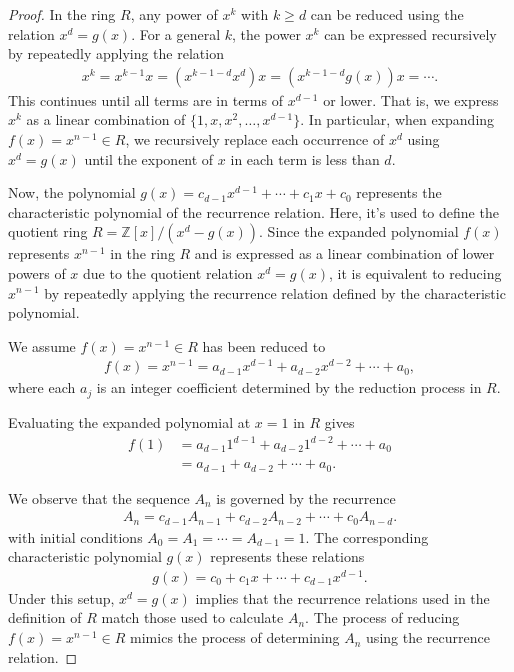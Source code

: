 \documentclass[12pt]{article}
\theoremstyle{plain}
\theoremstyle{definition}
\begin{document}
\begin{proof}
In the ring $R$, any power of $x^k$ with $k \geq d$ can be reduced using the relation $x^d = g(x)$. For a general $k$, the power $x^k$ can be expressed recursively by repeatedly applying the relation
\begin{align*}
x^k = x^{k-1} x = (x^{k-1-d} x^d) x = (x^{k-1-d} g(x)) x = \cdots .
\end{align*}
This continues until all terms are in terms of $x^{d-1}$ or lower. That is, we express $x^k$ as a linear combination of $\{1, x, x^2, \ldots, x^{d-1}\}$. In particular, when expanding $f(x) = x^{n-1} \in R$, we recursively replace each occurrence of $x^d$ using $x^d = g(x)$ until the exponent of $x$ in each term is less than $d$.

Now, the polynomial $g(x) = c_{d-1} x^{d-1} + \cdots + c_1 x + c_0$ represents the characteristic polynomial of the recurrence relation. Here, it's used to define the quotient ring $R = \mathbb{Z}[x]/(x^d - g(x))$. Since the expanded polynomial $f(x)$ represents $x^{n-1}$ in the ring $R$ and is expressed as a linear combination of lower powers of $x$ due to the quotient relation $x^d = g(x)$, it is equivalent to reducing $x^{n-1}$ by repeatedly applying the recurrence relation defined by the characteristic polynomial.

We assume $f(x) = x^{n-1} \in R$ has been reduced to
\begin{align*}
f(x) = x^{n-1} = a_{d-1} x^{d-1} + a_{d-2} x^{d-2} + \cdots + a_0 ,
\end{align*}
where each $a_j$ is an integer coefficient determined by the reduction process in $R$.

Evaluating the expanded polynomial at $x=1$ in $R$ gives
\begin{align*}
f(1) &= a_{d-1} 1^{d-1} + a_{d-2} 1^{d-2} + \cdots + a_0 \\
&= a_{d-1} + a_{d-2}+ \cdots + a_0 .
\end{align*}

We observe that the sequence $A_n$ is governed by the recurrence
\begin{align*}
A_{n} = c_{d-1} A_{n-1} + c_{d-2} A_{n-2} + \cdots + c_{0} A_{n-d} .
\end{align*}
with initial conditions $A_0 = A_1 = \cdots = A_{d-1} = 1$. The corresponding characteristic polynomial $g(x)$ represents these relations
\begin{align*}
g(x) = c_0 + c_1 x + \cdots + c_{d-1} x^{d-1} .
\end{align*}
Under this setup, $x^d = g(x)$ implies that the recurrence relations used in the definition of $R$ match those used to calculate $A_n$. The process of reducing $f(x) = x^{n-1} \in R$ mimics the process of determining $A_n$ using the recurrence relation.


\end{proof}
\end{document}
